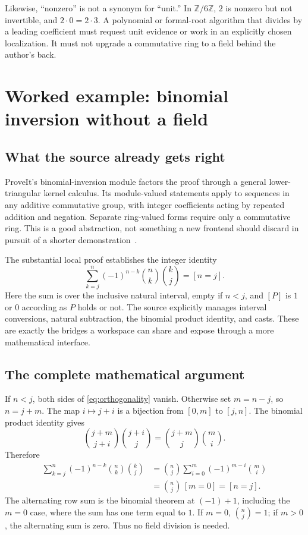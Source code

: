 \documentclass[11pt,letterpaper]{article}
\newcommand{\Z}{\mathbb Z}
\theoremstyle{definition}
\theoremstyle{remark}
\begin{document}
Likewise, ``nonzero'' is not a synonym for ``unit.'' In $\Z/6\Z$, $2$ is nonzero
but not invertible, and $2\cdot0=2\cdot3$. A polynomial or formal-root algorithm
that divides by a leading coefficient must request unit evidence or work in an
explicitly chosen localization. It must not upgrade a commutative ring to a
field behind the author's back.

\section{Worked example: binomial inversion without a field}
\label{sec:binomial}

\subsection{What the source already gets right}
ProveIt's binomial-inversion module factors the proof through a general
lower-triangular kernel calculus. Its module-valued statements apply to sequences
in any additive commutative group, with integer coefficients acting by repeated
addition and negation. Separate ring-valued forms require only a commutative
ring. This is a good abstraction, not something a new frontend should discard
in pursuit of a shorter demonstration~\cite{p-binomial}.

The substantial local proof establishes the integer identity
\begin{equation}
 \sum_{k=j}^{n}(-1)^{n-k}\binom nk\binom kj=[n=j].
 \label{eq:orthogonality}
\end{equation}
Here the sum is over the inclusive natural interval, empty if $n<j$, and $[P]$
is $1$ or $0$ according as $P$ holds or not. The source explicitly manages
interval conversions, natural subtraction, the binomial product identity,
and casts. These are exactly the bridges a workspace can share and expose
through a more mathematical interface.

\subsection{The complete mathematical argument}
If $n<j$, both sides of \eqref{eq:orthogonality} vanish. Otherwise set $m=n-j$,
so $n=j+m$. The map $i\mapsto j+i$ is a bijection from $[0,m]$ to $[j,n]$.
The binomial product identity gives
\[
 \binom{j+m}{j+i}\binom{j+i}{j}
   =\binom{j+m}{j}\binom mi.
\]
Therefore
\begin{align*}
 \sum_{k=j}^{n}(-1)^{n-k}\binom nk\binom kj
 &=\binom nj\sum_{i=0}^{m}(-1)^{m-i}\binom mi\\
 &=\binom nj\,[m=0]=[n=j].
\end{align*}
The alternating row sum is the binomial theorem at $(-1)+1$, including the
$m=0$ case, where the sum has one term equal to $1$. If $m=0$, $\binom nj=1$;
if $m>0$, the alternating sum is zero. Thus no field division is needed.
\end{document}
